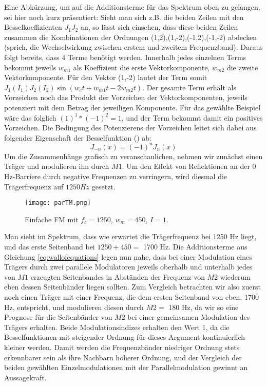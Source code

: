 Eine Abkürzung, um auf die Additionsterme für das Spektrum oben zu gelangen, sei hier noch kurz präsentiert: Sieht man sich z.B. die beiden Zeilen mit den Besselkoeffizienten \begin{math} J_1J_2 \end{math} an, so lässt sich einsehen, dass diese beiden Zeilen zusammen die Kombinationen der Ordnungen (1,2),(1,-2),(-1,2),(-1,-2) abdecken (sprich, die Wechselwirkung zwischen erstem und zweitem Frequenzband). Daraus folgt bereits, dass 4 Terme benötigt werden. Innerhalb jedes einzelnen Terms bekommt jeweils \begin{math} w_{m1} \end{math} als Koeffizient die erste Vektorkomponente, \begin{math} w_{m2} \end{math} die zweite Vektorkomponente. Für den Vektor (1,-2) lautet der Term somit \begin{math} J_1(I_1)J_2(I_2)\sin(w_ct + w_{m1}t - 2w_{m2}t) \end{math}. Der gesamte Term erhält als Vorzeichen noch das Produkt der Vorzeichen der Vektorkomponenten, jeweils potenziert mit dem Betrag der jeweiligen Komponente. Für das gewählte Beispiel wäre das folglich \begin{math} (1)^1*(-1)^2 = 1 \end{math}, und der Term bekommt damit ein positives Vorzeichen. Die Bedingung des Potenzierens der Vorzeichen leitet sich dabei aus folgender Eigenschaft der Besselfunktion (\cite[S.358, Satz~9.1.5]{abramowitz}) ab:
\begin{equation}
J_{-n}(x) = (-1)^nJ_n(x)
\end{equation}
Um die Zusammenhänge grafisch zu veranschaulichen, nehmen wir zunächst einen Träger und modulieren ihn durch $M1$. Um den Effekt von Reflektionen an der 0 Hz-Barriere durch negative Frequenzen zu verringern, wird diesmal die Trägerfrequenz auf $1250 Hz$ gesetzt. 
\FloatBarrier
\begin{figure} [ht]
\centering
  \texttt{[image: parTM.png]}
\caption{Einfache FM mit $f_c = 1250$, $w_m = 450$, $I = 1$. }
\end{figure}
\FloatBarrier
Man sieht im Spektrum, dass wie erwartet die Trägerfrequenz bei 1250 Hz liegt, und das erste Seitenband bei $ 1250 + 450 =$ 1700 Hz. Die Additionsterme aus Gleichung \ref{eq:wallofequations} legen nun nahe, dass bei einer Modulation eines Trägers durch zwei parallele Modulatoren jeweils oberhalb und unterhalb jedes von $M1$ erzeugten Seitenbandes in Abständen der Frequenz von $M2$ wiederum eben dessen Seitenbänder liegen sollten. Zum Vergleich betrachten wir also zuerst noch einen Träger mit einer Frequenz, die dem ersten Seitenband von eben, 1700 Hz, entspricht, und modulieren diesen durch $M2 =$ 180 Hz, da wir so eine Prognose für die Seitenbänder von $M2$ bei einer gemeinsamen Modulation des Trägers erhalten. Beide Modulationsindizes erhalten den Wert 1, da die Besselfunktionen mit steigender Ordnung für dieses Argument kontinuierlich kleiner werden. Damit werden die Frequenzbänder niedriger Ordnung stets erkennbarer sein als ihre Nachbarn höherer Ordnung, und der Vergleich der beiden gewählten Einzelmodulationen mit der Parallelmodulation gewinnt an Aussagekraft.
